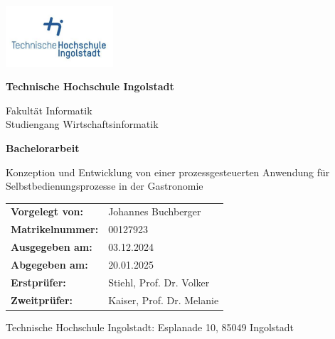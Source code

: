 
\begin{flushright}
    \includegraphics[width=0.3\textwidth]{title-page/thi-logo-head.png}
\end{flushright}

\begin{center}
    \vspace*{1cm}
            
    \huge
    \textbf{Technische Hochschule Ingolstadt}

    \vspace{0.5cm}
    \normalsize
    Fakultät Informatik\\
    Studiengang Wirtschaftsinformatik
    
    \vspace{1.5cm}       
    \huge
    \textbf{Bachelorarbeit}

    \vspace{0.2cm}
    \normalsize
    Konzeption und Entwicklung von einer prozessgesteuerten Anwendung für Selbstbedienungsprozesse in der Gastronomie
    
    \vspace{2cm}
    
    \begin{table}[h]
        \centering %
        \begin{tabular}{ll}
            \textbf{Vorgelegt von:} & Johannes Buchberger \\
            \textbf{Matrikelnummer:} & 00127923 \\
            \textbf{Ausgegeben am:} & 03.12.2024 \\
            \textbf{Abgegeben am:} & 20.01.2025 \\
            \textbf{Erstprüfer:} & Stiehl, Prof. Dr. Volker \\
            \textbf{Zweitprüfer:} & Kaiser, Prof. Dr. Melanie
        \end{tabular}
    \end{table}

    \vspace{2cm}
    \large 
    Technische Hochschule Ingolstadt: Esplanade 10, 85049 Ingolstadt
\end{center}
